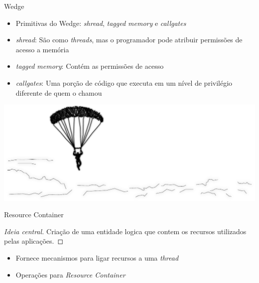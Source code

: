 \documentclass[xcolor={usenames,svgnames,dvipsnames},brazil,english,12pt,aspectratio=149]{beamer}
\begin{document}
\begin{frame}{Wedge}

  \begin{itemize}
    \item Primitivas do Wedge: \emph{shread}, \emph{tagged memory} e \emph{callgates}
    \item \emph{shread}: São como \emph{threads}, mas o programador pode atribuir permissões de acesso a memória
    \item \emph{tagged memory}: Contém as permissões de acesso
    \item \emph{callgates}: Uma porção de código que executa em um nível de privilégio diferente de quem o chamou
  \end{itemize}

\end{frame}

\begin{frame}[plain]
  \includegraphics[width=\textwidth]{presentation_cap2_four}
\end{frame}

\begin{frame}{Resource Container}

  \begin{proof}[Ideia central]
Criação de uma entidade logica que contem os recursos utilizados pelas aplicações.
  \end{proof}

    \begin{itemize}
      \item Fornece mecanismos para ligar recursos a uma \emph{thread}
      \item Operações para \emph{Resource Container}
    \end{itemize}

\end{frame}
\end{document}

